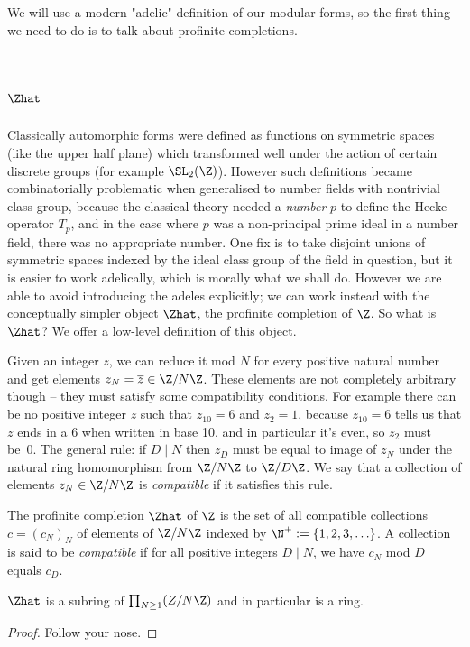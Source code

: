 We will use a modern "adelic" definition of our modular forms, so the first thing we need
to do is to talk about profinite completions.

\section{\texorpdfstring{$\Zhat$}{Zhat}}

Classically automorphic forms were defined as functions on symmetric spaces (like the upper half
plane) which transformed well under the action of certain discrete groups (for example $\SL_2(\Z)$).
However such definitions became combinatorially problematic when generalised to number fields
with nontrivial class group, because the classical theory needed a \emph{number} $p$ to define
the Hecke operator $T_p$, and in the case where $p$ was a non-principal prime ideal in a number
field, there was no appropriate number. One fix is to take disjoint unions of symmetric spaces
indexed by the ideal class group of the field in question, but it is easier to work adelically,
which is morally what we shall do. However we are able to avoid introducing the adeles
explicitly; we can work instead with the conceptually simpler object $\Zhat$,
the profinite completion of $\Z$. So what is $\Zhat$? We offer a low-level definition of this object.

Given an integer $z$, we can reduce it mod $N$ for every positive natural
number and get elements $z_N=\overline{z}\in\Z/N\Z$. These elements are not completely arbitrary
though -- they must satisfy some compatibility conditions. For example there can be no
positive integer $z$ such that $z_{10}=6$ and $z_2=1$, because $z_{10}=6$ tells us that
$z$ ends in a 6 when written in base 10, and in particular it's even, so $z_2$ must be~0.
The general rule: if $D\mid N$ then $z_D$ must be equal to image of $z_N$ under the natural
ring homomorphism from $\Z/N\Z$ to $\Z/D\Z$. We say that a collection of elements
$z_N\in\Z/N\Z$ is \emph{compatible} if it satisfies this rule.

\begin{definition}\label{ZHat}\leanok The profinite completion $\Zhat$ of $\Z$ is the set of
    all compatible collections $c=(c_N)_N$ of elements of $\Z/N\Z$ indexed by $\N^+:=\{1,2,3,\ldots\}$.
    A collection is said to be \emph{compatible} if for all positive integers
    $D\mid N$, we have $c_N$ mod $D$ equals $c_D$.
\end{definition}

\begin{lemma}
    \label{ZHat.commRing}
    \leanok
    $\Zhat$ is a subring of $\prod_{N\geq1}(Z/N\Z)$ and in particular is a ring.
\end{lemma}
\begin{proof} \leanok Follow your nose.
\end{proof}

